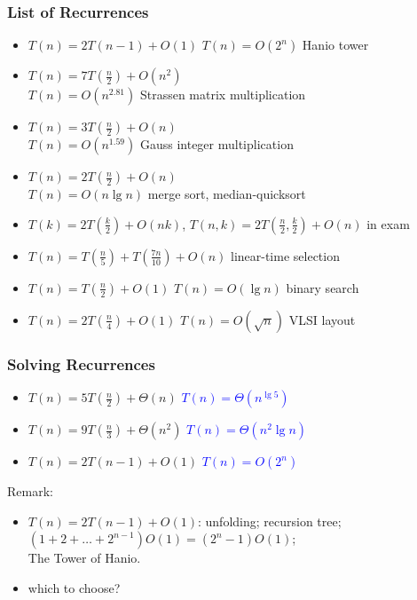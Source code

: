 \documentclass{beamer}
\begin{document}
\begin{frame}
  \frametitle{List of Recurrences}
  
  \begin{itemize}
    \setlength{\itemsep}{8pt}
    \item $T(n) = 2T(n-1) + O(1)$ \hfill $T(n) = O(2^n)$ Hanio tower
    \item $T(n) = 7T(\frac{n}{2}) + O(n^2)$ \\ \hfill $T(n) = O(n^{2.81})$
    Strassen matrix multiplication 
    \item $T(n) = 3T(\frac{n}{2}) + O(n)$ \\ \hfill $T(n) = O(n^{1.59})$ Gauss
    integer multiplication
    \item $T(n) = 2T(\frac{n}{2}) + O(n)$ \\ \hfill $T(n) = O(n \lg n)$ merge
    sort, median-quicksort
    \item $T(k) = 2T(\frac{k}{2}) + O(nk)$, 
    $T(n,k) = 2T(\frac{n}{2}, \frac{k}{2}) + O(n)$ \hfill in exam
    \item $T(n) = T(\frac{n}{5}) + T(\frac{7n}{10}) + O(n)$ \hfill linear-time
    selection
    \item $T(n) = T(\frac{n}{2}) + O(1)$ \hfill $T(n) = O(\lg n)$ binary
    search
    \item $T(n) = 2T(\frac{n}{4}) + O(1)$ \hfill $T(n) = O(\sqrt{n})$ VLSI
    layout
  \end{itemize} 
\end{frame}

\begin{frame}
  \frametitle{Solving Recurrences}
  
  \begin{Problem}
    \begin{itemize}
      \item $T(n) = 5T(\frac{n}{2}) + \Theta(n)$ \hfill
        \textcolor{blue}{$T(n) = \Theta(n^{\lg 5})$}
      \item $T(n) = 9T(\frac{n}{3}) + \Theta(n^2)$ \hfill
        \textcolor{blue}{$T(n) = \Theta(n^2 \lg n)$}
      \item $T(n) = 2T(n-1) + O(1)$ \hfill
        \textcolor{blue}{$T(n) = O(2^n)$}
    \end{itemize}
  \end{Problem}
  
  \begin{block}{Remark:}
    \begin{itemize}
      \item $T(n) = 2T(n-1) + O(1)$: unfolding; recursion tree; \\
      $(1 + 2 + \ldots + 2^{n-1}) O(1) = (2^{n}-1) O(1)$; \\ 
      The Tower of Hanio.
      \item which to choose?
    \end{itemize}
  \end{block}
\end{frame}
\end{document}
